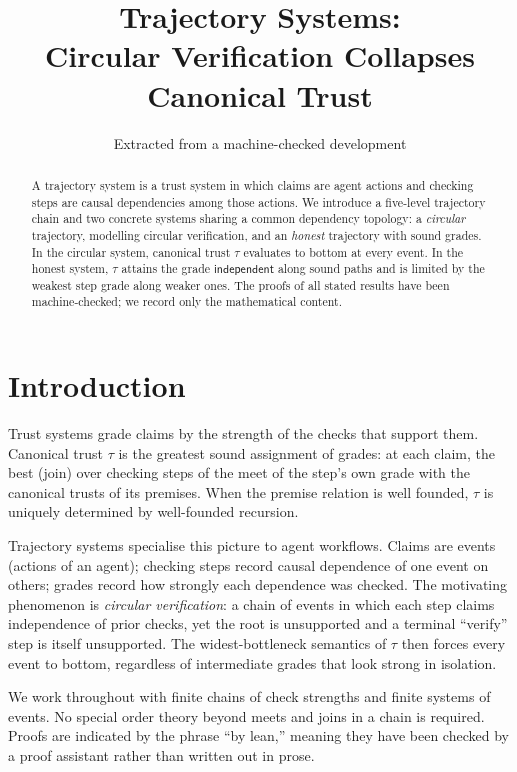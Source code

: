 \documentclass[11pt,a4paper]{article}
\title{Trajectory Systems:\\
  Circular Verification Collapses Canonical Trust}
\author{Extracted from a machine-checked development}
\date{}
\theoremstyle{plain}
\theoremstyle{definition}
\newcommand{\tauu}{\tau}
\begin{document}
\maketitle

\begin{abstract}
A trajectory system is a trust system in which claims are agent actions
and checking steps are causal dependencies among those actions. We introduce
a five-level trajectory chain and two concrete systems sharing a common
dependency topology: a \emph{circular} trajectory, modelling circular
verification, and an \emph{honest} trajectory with sound grades. In the
circular system, canonical trust $\tauu$ evaluates to bottom at every event.
In the honest system, $\tauu$ attains the grade $\mathsf{independent}$ along
sound paths and is limited by the weakest step grade along weaker ones. The
proofs of all stated results have been machine-checked; we record only the
mathematical content.
\end{abstract}

\tableofcontents
\bigskip

\section{Introduction}

Trust systems grade claims by the strength of the checks that support them.
Canonical trust $\tauu$ is the greatest sound assignment of grades: at each
claim, the best (join) over checking steps of the meet of the step's own
grade with the canonical trusts of its premises. When the premise relation
is well founded, $\tauu$ is uniquely determined by well-founded recursion.

Trajectory systems specialise this picture to agent workflows. Claims are
events (actions of an agent); checking steps record causal dependence of one
event on others; grades record how strongly each dependence was checked.
The motivating phenomenon is \emph{circular verification}: a chain of events
in which each step claims independence of prior checks, yet the root is
unsupported and a terminal ``verify'' step is itself unsupported. The
widest-bottleneck semantics of $\tauu$ then forces every event to bottom,
regardless of intermediate grades that look strong in isolation.

We work throughout with finite chains of check strengths and finite systems
of events. No special order theory beyond meets and joins in a chain is
required. Proofs are indicated by the phrase ``by lean,'' meaning they have
been checked by a proof assistant rather than written out in prose.
\end{document}
